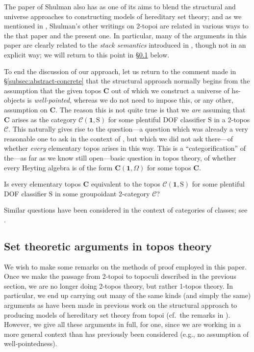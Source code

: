 \documentclass{amsart}
\newcommand\bC{\mathbf{C}}
\newcommand\cC{\mathcal{C}}
\newcommand\rS{\mathrm{S}}
\newcommand\tm{\mathbf{1}}
\newcommand\prerefpost[3]{%
  \texorpdfstring%
    {\hyperref[#2]{#1\ref*{#2}#3}}%
    {#1\ref*{#2}#3}%
}
\newcommand\sref[1]{\prerefpost{\S}{#1}{}}
\theoremstyle{definition}
\theoremstyle{remark}
\theoremstyle{plainwithref}
\begin{document}
The paper \cite{shulman-stack-semantics} of Shulman also has as one of its aims to blend the structural and universe approaches to constructing models of hereditary set theory; and as we mentioned in \cite{helfer-topoi-in-topoi}, Shulman's other writings \cite{shulman-nlab-page} on 2-topoi are related in various ways to the that paper and the present one.
In particular, many of the arguments in this paper are clearly related to the \emph{stack semantics} introduced in \cite{shulman-stack-semantics}, though not in an explicit way; we will return to this point in \sref{subsec:sets-and-topoi} below.

To end the discussion of our approach, let us return to the comment made in \sref{subsec:abstract-concrete} that the structural approach normally begins from the assumption that the given topos \( \bC \) out of which we construct a universe of hs-objects is \emph{well-pointed}, whereas we do not need to impose this, or any other, assumption on \( \bC \).
The reason this is not quite true is that we \emph{are} assuming that \( \bC \) arises as the category \( \cC(\tm, \rS) \) for some plentiful DOF classifier \( \rS \) in a 2-topos \( \cC \).
This naturally gives rise to the question---a question which was already a very reasonable one to ask in the context of \cite{helfer-topoi-in-topoi}, but which we did not ask there---of whether \emph{every} elementary topos arises in this way.
This is a ``categorification'' of the---as far as we know still open---basic question in topos theory, of whether every Heyting algebra is of the form \( \bC(\tm, \Omega) \) for some topos \( \bC \).
\begin{question} \label{question:internalizing-topoi}
  Is every elementary topos \( \bC \) equivalent to the topos \( \cC(\tm, \rS) \) for some plentiful DOF classifier \( \rS \) in some groupoidant 2-category \( \cC \)?
\end{question}
\noindent
Similar questions have been considered in the context of categories of classes; see \cite{awodey-butz-simpsons-streicher-relating}.

\subsection{Set theoretic arguments in topos theory} \label{subsec:sets-and-topoi}
We wish to make some remarks on the methods of proof employed in this paper.
Once we make the passage from 2-topoi to topoculi described in the previous section, we are no longer doing 2-topos theory, but rather 1-topos theory.
In particular, we end up carrying out many of the same kinds (and simply the same) arguments as have been made in previous work on the structural approach to producing models of hereditary set theory from topoi (cf.\ the remarks in \cite[\S8]{shulman-comparing}).
However, we give all these arguments in full, for one, since we are working in a more general context than has previously been considered (e.g., no assumption of well-pointedness).
\end{document}
